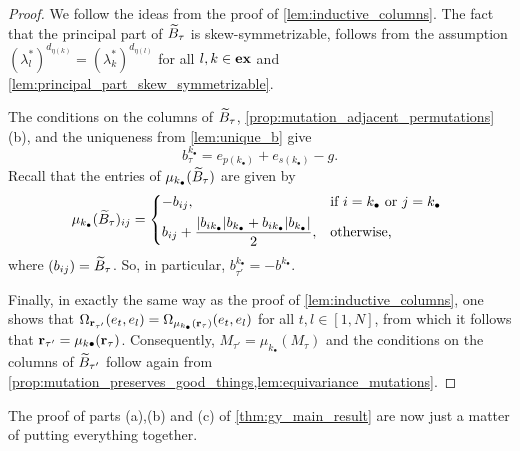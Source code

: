 \begin{proof}
	We follow the ideas from the proof of \cref{lem:inductive_columns}. The fact that the principal part of $\widetilde{B}_\tau$ is skew-symmetrizable, follows from the assumption $(\lambda^*_l)^{d_{\eta(k)}} = (\lambda^*_k)^{d_{\eta(l)}}$ for all $l,k \in \mathbf{ex}$ and \cref{lem:principal_part_skew_symmetrizable}.

	The conditions on the columns of $\widetilde{B}_\tau$, \cref{prop:mutation_adjacent_permutations}
	(b), and the uniqueness from \cref{lem:unique_b} give
	\begin{equation*}
		b^{k_\bullet}_\tau = e_{p(k_\bullet)} + e_{s(k_\bullet)} -g.
	\end{equation*}
	Recall that the entries of $\mu_{k_\bullet}(\widetilde{B}_{\tau})$ are given by
	\begin{equation*}
		\mu_{k_\bullet}(\tB_{\tau})_{ij} = \begin{dcases*}
			-b_{ij},                                                                            & if $i = k_\bullet$ or $j = k_\bullet$ \\
			b_{ij} +  \frac{|b_{ik_\bullet}|b_{k_\bullet} + b_{ik_\bullet} |b_{k_\bullet}|}{2}, & otherwise,
		\end{dcases*}
	\end{equation*}
	where $(b_{ij}) = \widetilde{B}_\tau$. So, in particular, $b^{k_\bullet}_{\tau'} = -
		b^{k_\bullet}$.

	Finally, in exactly the same way as the proof of \cref{lem:inductive_columns}, one
	shows that $\Omega_{\mathbf{r}_{\tau'}}(e_t, e_l) = \Omega_{\mu_{k_\bullet}(\mathbf{r}_\tau)}(e_t,
		e_l)$ for all $t, l \in [1, N]$, from which it follows that $\mathbf{r}_{\tau'} =
		\mu_{k\bullet}(\mathbf{r}_\tau)$. Consequently, $M_{\tau'} = \mu_{k_\bullet}(M_\tau)$ and the
	conditions on the columns of $\widetilde{B}_{\tau'}$ follow again from
	\cref{prop:mutation_preserves_good_things,lem:equivariance_mutations}.

\end{proof}
The proof of parts (a),(b) and (c) of \cref{thm:gy_main_result} are now just a matter of putting everything together.
